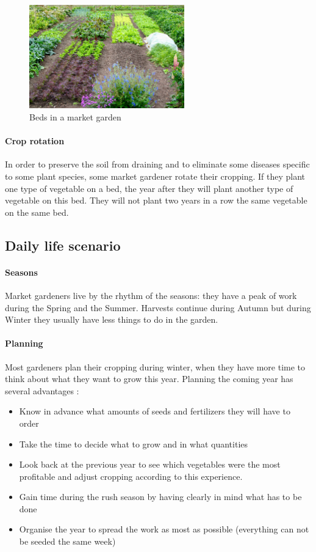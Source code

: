 \begin{figure}
    \centering
    \includegraphics[width=0.6\textwidth]{images/beds.jpg}
    \caption{Beds in a market garden}
    \label{fig:beds}
\end{figure}

\paragraph{Crop rotation} In order to preserve the soil from draining and to eliminate some diseases specific to some plant species, some market gardener rotate their cropping. If they plant one type of vegetable on a bed, the year after they will plant another type of vegetable on this bed. They will not plant two years in a row the same vegetable on the same bed.

\subsection{Daily life scenario}

\paragraph{Seasons} Market gardeners live by the rhythm of the seasons: they have a peak of work during the Spring and the Summer. Harvests continue during Autumn but during Winter they usually have less things to do in the garden. 

\paragraph{Planning}

Most gardeners plan their cropping during winter\cite{planification-methodology}, when they have more time to think about what they want to grow this year. Planning the coming year has several advantages : 

\begin{itemize}
	\item Know in advance what amounts of seeds and fertilizers they will have to order
	\item Take the time to decide what to grow and in what quantities
	\item Look back at the previous year to see which vegetables were the most profitable and adjust cropping according to this experience.
	\item Gain time during the rush season by having clearly in mind what has to be done
	\item Organise the year to spread the work as most as possible (everything can not be seeded the same week)
\end{itemize}

